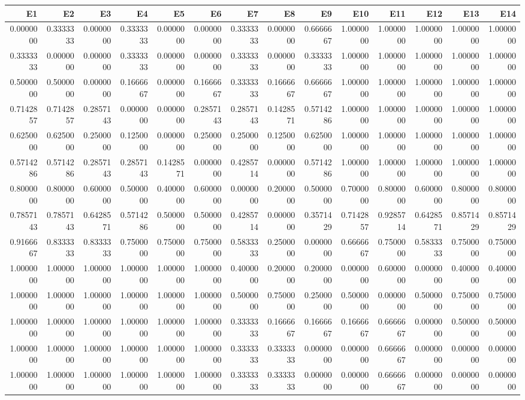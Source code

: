 
\begin{tabular}[t]{r|r|r|r|r|r|r|r|r|r|r|r|r|r}
\hline
E1 & E2 & E3 & E4 & E5 & E6 & E7 & E8 & E9 & E10 & E11 & E12 & E13 & E14\\
\hline
0.0000000 & 0.3333333 & 0.0000000 & 0.3333333 & 0.0000000 & 0.0000000 & 0.3333333 & 0.0000000 & 0.6666667 & 1.0000000 & 1.0000000 & 1.0000000 & 1.0000000 & 1.0000000\\
\hline
0.3333333 & 0.0000000 & 0.0000000 & 0.3333333 & 0.0000000 & 0.0000000 & 0.3333333 & 0.0000000 & 0.3333333 & 1.0000000 & 1.0000000 & 1.0000000 & 1.0000000 & 1.0000000\\
\hline
0.5000000 & 0.5000000 & 0.0000000 & 0.1666667 & 0.0000000 & 0.1666667 & 0.3333333 & 0.1666667 & 0.6666667 & 1.0000000 & 1.0000000 & 1.0000000 & 1.0000000 & 1.0000000\\
\hline
0.7142857 & 0.7142857 & 0.2857143 & 0.0000000 & 0.0000000 & 0.2857143 & 0.2857143 & 0.1428571 & 0.5714286 & 1.0000000 & 1.0000000 & 1.0000000 & 1.0000000 & 1.0000000\\
\hline
0.6250000 & 0.6250000 & 0.2500000 & 0.1250000 & 0.0000000 & 0.2500000 & 0.2500000 & 0.1250000 & 0.6250000 & 1.0000000 & 1.0000000 & 1.0000000 & 1.0000000 & 1.0000000\\
\hline
0.5714286 & 0.5714286 & 0.2857143 & 0.2857143 & 0.1428571 & 0.0000000 & 0.4285714 & 0.0000000 & 0.5714286 & 1.0000000 & 1.0000000 & 1.0000000 & 1.0000000 & 1.0000000\\
\hline
0.8000000 & 0.8000000 & 0.6000000 & 0.5000000 & 0.4000000 & 0.6000000 & 0.0000000 & 0.2000000 & 0.5000000 & 0.7000000 & 0.8000000 & 0.6000000 & 0.8000000 & 0.8000000\\
\hline
0.7857143 & 0.7857143 & 0.6428571 & 0.5714286 & 0.5000000 & 0.5000000 & 0.4285714 & 0.0000000 & 0.3571429 & 0.7142857 & 0.9285714 & 0.6428571 & 0.8571429 & 0.8571429\\
\hline
0.9166667 & 0.8333333 & 0.8333333 & 0.7500000 & 0.7500000 & 0.7500000 & 0.5833333 & 0.2500000 & 0.0000000 & 0.6666667 & 0.7500000 & 0.5833333 & 0.7500000 & 0.7500000\\
\hline
1.0000000 & 1.0000000 & 1.0000000 & 1.0000000 & 1.0000000 & 1.0000000 & 0.4000000 & 0.2000000 & 0.2000000 & 0.0000000 & 0.6000000 & 0.0000000 & 0.4000000 & 0.4000000\\
\hline
1.0000000 & 1.0000000 & 1.0000000 & 1.0000000 & 1.0000000 & 1.0000000 & 0.5000000 & 0.7500000 & 0.2500000 & 0.5000000 & 0.0000000 & 0.5000000 & 0.7500000 & 0.7500000\\
\hline
1.0000000 & 1.0000000 & 1.0000000 & 1.0000000 & 1.0000000 & 1.0000000 & 0.3333333 & 0.1666667 & 0.1666667 & 0.1666667 & 0.6666667 & 0.0000000 & 0.5000000 & 0.5000000\\
\hline
1.0000000 & 1.0000000 & 1.0000000 & 1.0000000 & 1.0000000 & 1.0000000 & 0.3333333 & 0.3333333 & 0.0000000 & 0.0000000 & 0.6666667 & 0.0000000 & 0.0000000 & 0.0000000\\
\hline
1.0000000 & 1.0000000 & 1.0000000 & 1.0000000 & 1.0000000 & 1.0000000 & 0.3333333 & 0.3333333 & 0.0000000 & 0.0000000 & 0.6666667 & 0.0000000 & 0.0000000 & 0.0000000\\
\hline
\end{tabular}
